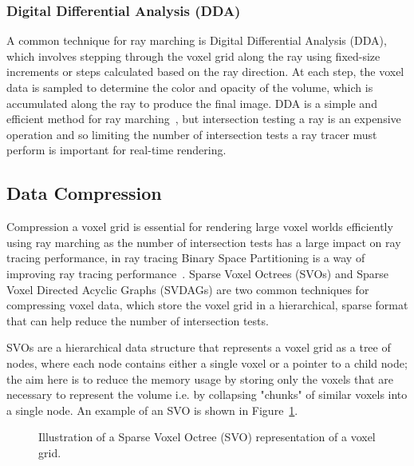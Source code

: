 \documentclass{article}
\begin{document}
\subsubsection{Digital Differential Analysis (DDA)}
A common technique for ray marching is Digital Differential Analysis (DDA), which involves stepping through the voxel grid along the ray using fixed-size increments or steps calculated based on the ray direction. At each step, the voxel data is sampled to determine the color and opacity of the volume, which is accumulated along the ray to produce the final image. DDA is a simple and efficient method for ray marching~\cite{Amanatides_Woo_1987}, but intersection testing a ray is an expensive operation and so limiting the number of intersection tests a ray tracer must perform is important for real-time rendering.

\subsection{Data Compression}
Compression a voxel grid is essential for rendering large voxel worlds efficiently using ray marching as the number of intersection tests has a large impact on ray tracing performance, in ray tracing Binary Space Partitioning is a way of improving ray tracing performance~\cite{Ize_2009}. Sparse Voxel Octrees (SVOs) and Sparse Voxel Directed Acyclic Graphs (SVDAGs) are two common techniques for compressing voxel data, which store the voxel grid in a hierarchical, sparse format that can help reduce the number of intersection tests.

SVOs are a hierarchical data structure that represents a voxel grid as a tree of nodes, where each node contains either a single voxel or a pointer to a child node; the aim here is to reduce the memory usage by storing only the voxels that are necessary to represent the volume i.e. by collapsing "chunks" of similar voxels into a single node. An example of an SVO is shown in Figure~\ref{fig:svo}.

\begin{figure}[thp]
    \begin{center}
    \end{center}
    \caption{Illustration of a Sparse Voxel Octree (SVO) representation of a voxel grid.}
    \label{fig:svo}
\end{figure}
\end{document}
